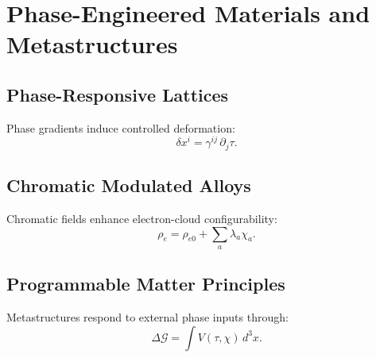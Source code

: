 \chapter{Phase-Engineered Materials and Metastructures}

\section{Phase-Responsive Lattices}
Phase gradients induce controlled deformation:
\[
\delta x^i = \gamma^{ij}\,\partial_j \tau.
\]

\section{Chromatic Modulated Alloys}
Chromatic fields enhance electron-cloud configurability:
\[
\rho_e = \rho_{e0} + \sum_a \lambda_a \chi_a.
\]

\section{Programmable Matter Principles}
Metastructures respond to external phase inputs through:
\[
\Delta \mathcal{G} = \int V(\tau,\chi)\, d^3x.
\]


